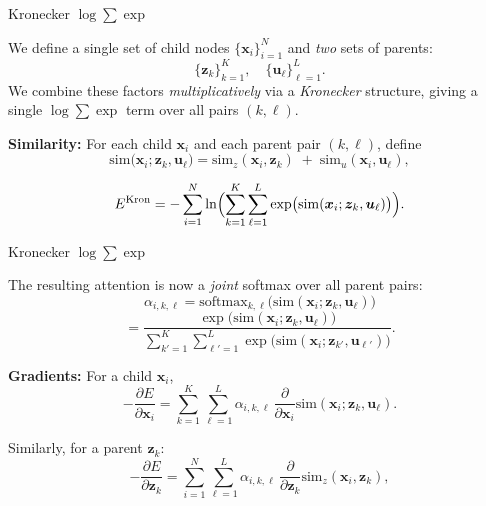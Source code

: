 \documentclass{beamer}
\begin{document}
\begin{frame}{Kronecker $\log \sum \exp$}

    We define a single set of child nodes \(\{\bm{x}_i\}_{i=1}^N\) and \emph{two} sets of parents:
    \[
    \{\bm{z}_k\}_{k=1}^K, 
    \quad 
    \{\bm{u}_\ell\}_{\ell=1}^L.
    \]
     We combine these factors \emph{multiplicatively} via a \emph{Kronecker} structure, giving a single $\log \sum \exp$ term over all pairs \((k,\ell)\).
    
    \bigskip
    
    \textbf{Similarity:} For each child \(\bm{x}_i\) and each parent pair \((k,\ell)\), define
    \[
    \mathrm{sim}\bigl(\bm{x}_i; \bm{z}_k, \bm{u}_\ell\bigr)
    =
    \mathrm{sim}_z(\bm{x}_i, \bm{z}_k) 
    \;+\;
    \mathrm{sim}_u(\bm{x}_i, \bm{u}_\ell),
    \]
 
    \[
    E^{\mathrm{Kron}}
    =
    -\sum_{i=1}^N 
    \ln \Bigl(
    \sum_{k=1}^K \sum_{\ell=1}^L
    \exp\bigl(\mathrm{sim}(\bm{x}_i;\bm{z}_k,\bm{u}_\ell)\bigr)
    \Bigr).
    \]
    
    \end{frame}
    
\begin{frame}{Kronecker $\log \sum \exp$}

    The resulting attention is now a \emph{joint} softmax over all parent pairs:
    \[
    \alpha_{i,k,\ell} 
    =
    \mathrm{softmax}_{k,\ell}\bigl(\mathrm{sim}(\bm{x}_i; \bm{z}_k,\bm{u}_\ell)\bigr)
    \]
    \[
    =
    \frac{\exp\bigl(\mathrm{sim}(\bm{x}_i;\bm{z}_k,\bm{u}_\ell)\bigr)}
         {\sum_{k'=1}^K \sum_{\ell'=1}^L \exp\bigl(\mathrm{sim}(\bm{x}_i;\bm{z}_{k'},\bm{u}_{\ell'})\bigr)}.
    \]
    
    \bigskip
    
    \textbf{Gradients:}  
    For a child \(\bm{x}_i\),
    \[
    -\frac{\partial E}{\partial \bm{x}_i}
    =
    \sum_{k=1}^K \sum_{\ell=1}^L 
    \alpha_{i,k,\ell}\,
    \frac{\partial}{\partial \bm{x}_i}
    \mathrm{sim}(\bm{x}_i; \bm{z}_k,\bm{u}_\ell).
    \]
    
    Similarly, for a parent \(\bm{z}_k\):
    \[
    -\frac{\partial E}{\partial \bm{z}_k}
    =
    \sum_{i=1}^N \sum_{\ell=1}^L
    \alpha_{i,k,\ell}\,
    \frac{\partial}{\partial \bm{z}_k}
    \mathrm{sim}_z(\bm{x}_i, \bm{z}_k),
    \]
    
    \end{frame}
    
\end{document}
